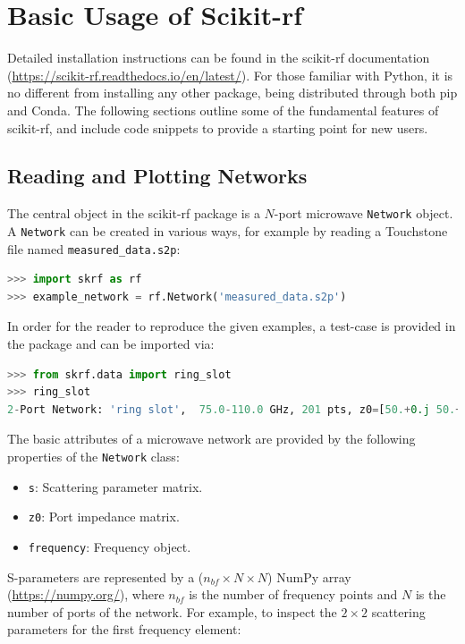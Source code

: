 \documentclass[journal, onecolumn]{IEEEtran}
\begin{document}
\section{Basic Usage of Scikit-rf}

Detailed installation instructions can be found in the scikit-rf documentation (\url{https://scikit-rf.readthedocs.io/en/latest/}). For those familiar with Python, it is no different from installing any other package, being distributed through both pip and Conda. The following sections outline some of the fundamental features of scikit-rf, and include code snippets to provide a starting point for new users.

\subsection{Reading and Plotting Networks}
The central object in the scikit-rf package is a $N$-port microwave \texttt{Network} object. A \texttt{Network} can be created in various ways, for example by reading a Touchstone file named \texttt{measured\_data.s2p}:

\begin{lstlisting}[language=Python]
>>> import skrf as rf
>>> example_network = rf.Network('measured_data.s2p')
\end{lstlisting}

In order for the reader to reproduce the given examples, a test-case is provided in the package and can be imported via:

\begin{lstlisting}[language=Python]
>>> from skrf.data import ring_slot
>>> ring_slot
2-Port Network: 'ring slot',  75.0-110.0 GHz, 201 pts, z0=[50.+0.j 50.+0.j]
\end{lstlisting}

The basic attributes of a microwave network are provided by the following properties of the \texttt{Network} class:
\begin{itemize}
\item \texttt{s}: Scattering parameter matrix.
\item \texttt{z0}: Port impedance matrix.
\item \texttt{frequency}: Frequency object.
\end{itemize}

S-parameters are represented by a ($n_{bf} \times N \times N$) NumPy array \cite{harris2020} (\url{https://numpy.org/}), where $n_{bf}$ is the number of frequency points and $N$ is the number of ports of the network. For example, to inspect the $2 \times 2$ scattering parameters for the first frequency element:
\end{document}
